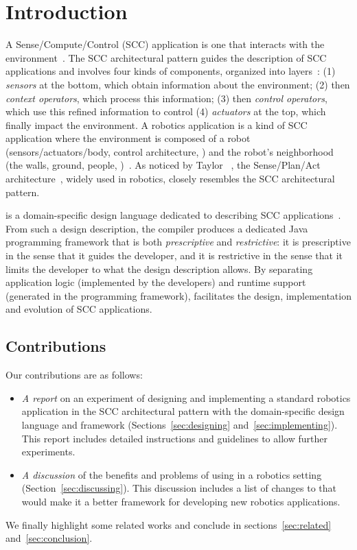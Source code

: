 \section{Introduction}

A Sense/Compute/Control (SCC) application is one that interacts with
the environment~\cite{Tayl09a}. The SCC architectural pattern
guides the description of SCC applications and involves four kinds of
components, organized into layers~\cite{Cass11a,Edwar09a}: (1)
\emph{sensors} at the bottom, which obtain information about the
environment; (2) then \emph{context operators}, which process this
information; (3) then \emph{control operators}, which use this refined
information to control (4) \emph{actuators} at the top, which finally
impact the environment. A robotics application is a kind of SCC
application where the environment is composed of a robot
(sensors/actuators/body, control architecture, \etc{}) and the robot's
neighborhood (the walls, ground, people, \etc{})~\cite{Sicil08a}. As
noticed by Taylor \etal{}~\cite{Tayl09a}, the Sense/Plan/Act
architecture~\cite{Sicil08a}, widely used in robotics, closely
resembles the SCC architectural pattern.

\diaspec{} is a domain-specific design language dedicated to
describing SCC applications~\cite{Cass09b,Cass11a}. From such a design
description, the \diaspec{} compiler produces a dedicated Java
programming framework that is both \emph{prescriptive} and
\emph{restrictive}: it is prescriptive in the sense that it guides the
developer, and it is restrictive in the sense that it limits the
developer to what the design description allows. By separating
application logic (implemented by the developers) and runtime support
(generated in the programming framework), \diaspec{} facilitates the
design, implementation and evolution of SCC applications.


\subsection*{Contributions}

Our contributions are as follows:

\begin{itemize}
\item \emph{A report} on an experiment of designing and implementing a
  standard robotics application in the SCC architectural pattern with
  the \diaspec{} domain-specific design language and framework
  (Sections~\ref{sec:designing} and~\ref{sec:implementing}). This
  report includes detailed instructions and guidelines to allow
  further experiments.
\item \emph{A discussion} of the benefits and problems of using
  \diaspec{} in a robotics setting (Section~\ref{sec:discussing}).
  This discussion includes a list of changes to \diaspec{} that would
  make it a better framework for developing new robotics applications.
\end{itemize}

We finally highlight some related works and conclude in
sections~\ref{sec:related} and~\ref{sec:conclusion}.




